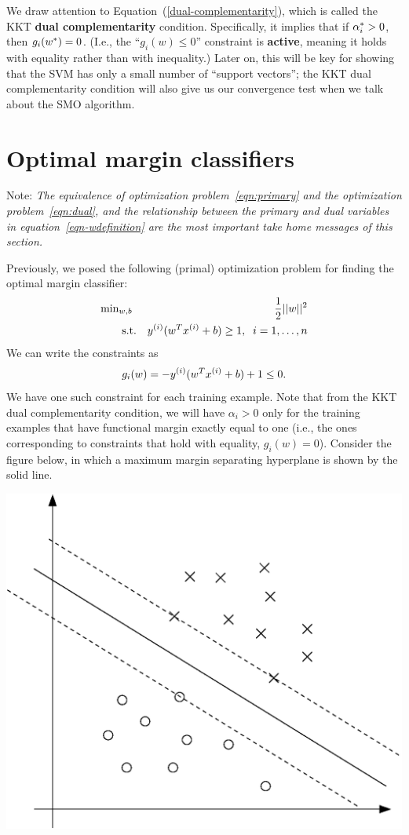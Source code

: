 \documentclass{article}
\newcommand{\notes}[1]{{\color{blue} Note:} \textit{#1} \newline}
\begin{document}
We draw attention to Equation~(\ref{dual-complementarity}), which is called the
KKT {\bf dual complementarity} condition.  Specifically, it implies that if
$\alpha^{\ast}_i > 0$, then $g_i({w^{\ast}}) = 0$.  (I.e., the ``$g_i(w) \leq 0$''
constraint is {\bf active}, meaning it holds with equality rather
than with inequality.)
Later on, this will be key for showing that the SVM has only a small number of ``support vectors'';
the KKT dual complementarity condition will also give us our convergence test when we talk
about the SMO algorithm.


\section{Optimal margin classifiers}

\notes{The equivalence of optimization problem~\eqref{eqn:primary} and the optimization problem~\eqref{eqn:dual}, and the relationship between the primary and dual variables in equation~\eqref{eqn-wdefinition} are the most important take home messages of this section. }

Previously, we posed the following (primal) optimization problem for finding the optimal margin
classifier:
\begin{eqnarray}
&\hbox{min}_{w,b}& \frac{1}{2} ||w||^2 \label{eqn:primary} \\
&\;\;\;\;\;\;\;\hbox{s.t.}& {y^{(i)}} (w^T{x^{(i)}} + b) \geq 1,\;\; i=1, \ldots, {n} \nonumber
\end{eqnarray}
We can write the constraints as
\[
g_i(w) = - {y^{(i)}} (w^T{x^{(i)}} + b) + 1 \leq 0.
\]
We have one such constraint for each training example.  Note that from the KKT dual
complementarity condition, we will have $\alpha_i > 0$ only for the training examples
that have functional margin exactly equal to one (i.e., the ones corresponding
to constraints that hold with equality, $g_i(w) = 0$).  Consider the figure below,
in which a maximum margin separating hyperplane is shown by the solid line.

\begin{center}
\includegraphics[scale=0.5]{supportVectors.eps}
\end{center}
\end{document}
